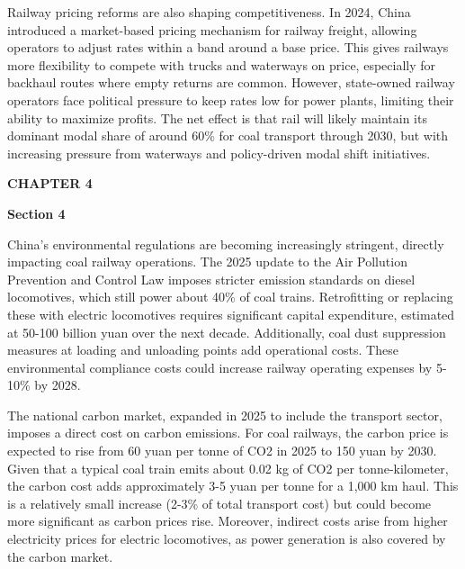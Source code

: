 \documentclass[10pt,a4paper]{article}
\begin{document}
{\small {\small Railway pricing reforms are also shaping competitiveness. In 2024, China introduced a market-based pricing mechanism for railway freight, allowing operators to adjust rates within a band around a base price. This gives railways more flexibility to compete with trucks and waterways on price, especially for backhaul routes where empty returns are common. However, state-owned railway operators face political pressure to keep rates low for power plants, limiting their ability to maximize profits. The net effect is that rail will likely maintain its dominant modal share of around 60\% for coal transport through 2030, but with increasing pressure from waterways and policy-driven modal shift initiatives.}}

\clearpage
{\textcolor{BOBlue}{\scriptsize\bfseries CHAPTER 4}}\par\vspace{-1pt}
{\Large\sffamily\bfseries\color{BONavy} Section 4}\par\vspace{4pt}
{\small China's environmental regulations are becoming increasingly stringent, directly impacting coal railway operations. The 2025 update to the Air Pollution Prevention and Control Law imposes stricter emission standards on diesel locomotives, which still power about 40\% of coal trains. Retrofitting or replacing these with electric locomotives requires significant capital expenditure, estimated at 50-100 billion yuan over the next decade. Additionally, coal dust suppression measures at loading and unloading points add operational costs. These environmental compliance costs could increase railway operating expenses by 5-10\% by 2028.}

{\small The national carbon market, expanded in 2025 to include the transport sector, imposes a direct cost on carbon emissions. For coal railways, the carbon price is expected to rise from 60 yuan per tonne of CO2 in 2025 to 150 yuan by 2030. Given that a typical coal train emits about 0.02 kg of CO2 per tonne-kilometer, the carbon cost adds approximately 3-5 yuan per tonne for a 1,000 km haul. This is a relatively small increase (2-3\% of total transport cost) but could become more significant as carbon prices rise. Moreover, indirect costs arise from higher electricity prices for electric locomotives, as power generation is also covered by the carbon market.}
\end{document}
